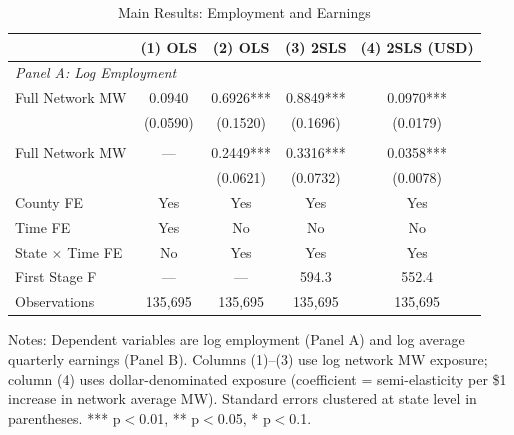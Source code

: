 \begin{table}[H]
\centering
\caption{Main Results: Employment and Earnings}
\label{tab:mainresults}
\small
\begin{tabular}{l cccc}
\toprule
 & (1) OLS & (2) OLS & (3) 2SLS & (4) 2SLS (USD) \\
\midrule
\multicolumn{5}{l}{\textit{Panel A: Log Employment}} \\[3pt]
Full Network MW & 0.0940 & 0.6926*** & 0.8849*** & 0.0970*** \\
 & (0.0590) & (0.1520) & (0.1696) & (0.0179) \\
\addlinespace
\multicolumn{5}{l}{\textit{Panel B: Log Earnings}} \\[3pt]
Full Network MW & --- & 0.2449*** & 0.3316*** & 0.0358*** \\
 & & (0.0621) & (0.0732) & (0.0078) \\
\midrule
County FE & Yes & Yes & Yes & Yes \\
Time FE & Yes & No & No & No \\
State $\times$ Time FE & No & Yes & Yes & Yes \\
First Stage F & --- & --- & 594.3 & 552.4 \\
Observations & 135,695 & 135,695 & 135,695 & 135,695 \\
\bottomrule
\end{tabular}
\begin{figurenotes}
Notes: Dependent variables are log employment (Panel A) and log average quarterly earnings (Panel B). 
Columns (1)--(3) use log network MW exposure; column (4) uses dollar-denominated exposure 
(coefficient = semi-elasticity per \$1 increase in network average MW). 
Standard errors clustered at state level in parentheses. 
*** p$<$0.01, ** p$<$0.05, * p$<$0.1.
\end{figurenotes}
\end{table}
